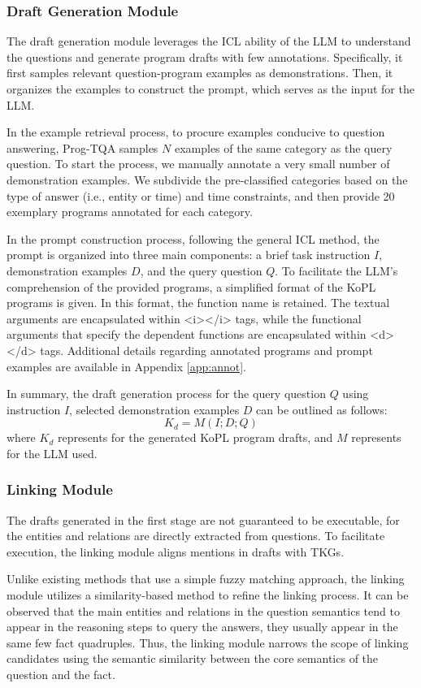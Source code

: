\documentclass[10pt, a4paper]{article}
\begin{document}
\subsubsection{Draft Generation Module}\label{sec:kdg}
The draft generation module leverages the ICL ability of the LLM to understand the questions and generate program drafts with few annotations. Specifically, it first samples relevant question-program examples as demonstrations. Then, it organizes the examples to construct the prompt, which serves as the input for the LLM.

In the example retrieval process, to procure examples conducive to question answering, Prog-TQA samples $N$ examples of the same category as the query question.  To start the process, we manually annotate a very small number of demonstration examples. We subdivide the pre-classified categories based on the type of answer (i.e., entity or time) and time constraints, and then provide 20 exemplary programs annotated for each category.
 
In the prompt construction process, following the general ICL method, the prompt is organized into three main components: a brief task instruction $I$, demonstration examples $D$, and the query question $Q$. To facilitate the LLM's comprehension of the provided programs, a simplified format of the KoPL programs is given. In this format, the function name is retained. The textual arguments are encapsulated within <i></i> tags, while the functional arguments that specify the dependent functions are encapsulated within <d></d> tags. Additional details regarding annotated programs and prompt examples are available in Appendix \ref{app:annot}.

In summary, the draft generation process for the query question $Q$ using instruction $I$, selected demonstration examples $D$ can be outlined as follows:
\[
{K}_d = {M}(I;D;Q)
\]where ${K}_d$ represents for the generated KoPL program drafts, and ${M}$ represents for the LLM used.
\subsubsection{Linking Module}\label{sec:link}
The drafts generated in the first stage are not guaranteed to be executable, for the entities and relations are directly extracted from questions. To facilitate execution, the linking module aligns mentions in drafts with TKGs. 

Unlike existing methods that use a simple fuzzy matching approach, the linking module utilizes a similarity-based method to refine the linking process. It can be observed that the main entities and relations in the question semantics tend to appear in the reasoning steps to query the answers, they usually appear in the same few fact quadruples. Thus, the linking module narrows the scope of linking candidates using the semantic similarity between the core semantics of the question and the fact.
\end{document}
